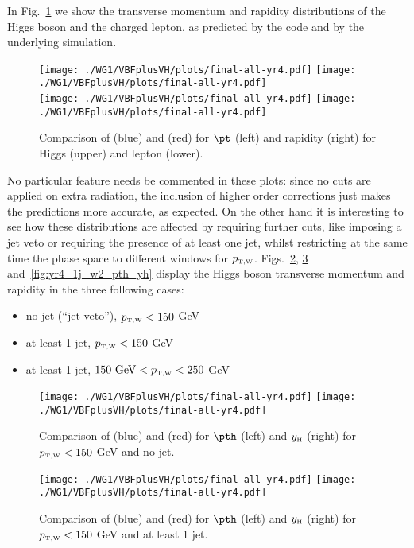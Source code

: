 In Fig.~\ref{fig:yr4_pth_yh_ptlep_ylep} we show the transverse
momentum and rapidity distributions of the Higgs boson and the charged
lepton, as predicted by the \HVNNLOPS{} code and by the underlying
\HWJMINLO{} simulation.
\begin{figure}
  \centering
  \texttt{[image: ./WG1/VBFplusVH/plots/final-all-yr4.pdf]}
  \texttt{[image: ./WG1/VBFplusVH/plots/final-all-yr4.pdf]}\\
%
  \texttt{[image: ./WG1/VBFplusVH/plots/final-all-yr4.pdf]}
  \texttt{[image: ./WG1/VBFplusVH/plots/final-all-yr4.pdf]}
  \caption{Comparison of \HWJMINLOPS{} (blue) and \HWNNLOPS{} (red) for $\pt$ (left) and rapidity (right) for Higgs (upper) and lepton (lower).}
  \label{fig:yr4_pth_yh_ptlep_ylep}
\end{figure}
No particular feature needs be commented in these plots: since no cuts
are applied on extra radiation, the inclusion of higher order
corrections just makes the \HVNNLO{} predictions more accurate, as
expected. On the other hand it is interesting to see how these
distributions are affected by requiring further cuts, like imposing a
jet veto or requiring the presence of at least one jet, whilst restricting at
the same time the phase space to different windows for
$p_{\scriptscriptstyle \mathrm{T,W}}$. Figs.~\ref{fig:yr4_0j_w1_pth_yh}, \ref{fig:yr4_1j_w1_pth_yh}
and~\ref{fig:yr4_1j_w2_pth_yh} display the Higgs boson transverse
momentum and rapidity in the three following cases:
\begin{itemize}
\item no jet (``jet veto''), $p_{\scriptscriptstyle \mathrm{T,W}}<150$ GeV
\item at least 1 jet, $p_{\scriptscriptstyle \mathrm{T,W}}<150$ GeV
\item at least 1 jet, $150\mbox{ GeV}<p_{\scriptscriptstyle \mathrm{T,W}}<250$ GeV
\end{itemize}
\begin{figure}
  \centering
  \texttt{[image: ./WG1/VBFplusVH/plots/final-all-yr4.pdf]}
  \texttt{[image: ./WG1/VBFplusVH/plots/final-all-yr4.pdf]}
  \caption{Comparison of \HWJMINLOPS{} (blue) and \HWNNLOPS{} (red) for $\pth$ (left) and $y_{\scriptscriptstyle \mathrm{H}}$ (right) for $p_{\scriptscriptstyle \mathrm{T,W}}<150$ GeV and no jet.}
  \label{fig:yr4_0j_w1_pth_yh}
\end{figure}
\begin{figure}
  \centering
  \texttt{[image: ./WG1/VBFplusVH/plots/final-all-yr4.pdf]}
  \texttt{[image: ./WG1/VBFplusVH/plots/final-all-yr4.pdf]}
  \caption{Comparison of \HWJMINLOPS{} (blue) and \HWNNLOPS{} (red) for $\pth$ (left) and $y_{\scriptscriptstyle \mathrm{H}}$ (right) for $p_{\scriptscriptstyle \mathrm{T,W}}<150$ GeV and at least 1 jet.}
  \label{fig:yr4_1j_w1_pth_yh}
\end{figure}
